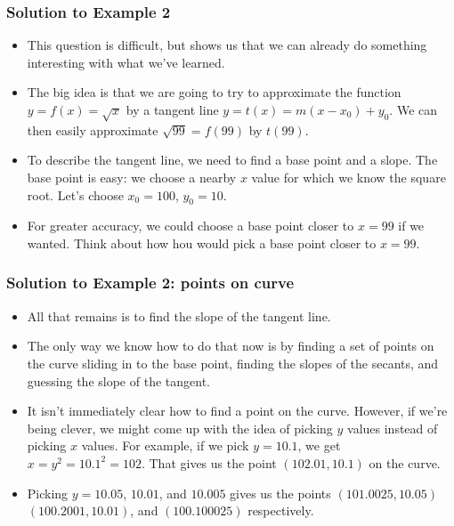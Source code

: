 \documentclass[serif,ignorenonframetext]{beamer}
\begin{document}
\begin{frame}
  \frametitle{Solution to Example 2}
  \begin{itemize}
  \item This question is difficult, 
    but shows us that we can already do something
    interesting with what we've learned.
  \item The big idea is that we are going to try to approximate the
    function $y=f(x)=\sqrt{x}$ by a tangent line
    $y=t(x)=m(x-x_0)+y_0$.  We can then easily approximate
    $\sqrt{99} = f(99)$ by $t(99)$.
  \item To describe the tangent line, we need to find a base point and
    a slope.  The base point is easy: we choose a nearby $x$ value for
    which we know the square root.  Let's choose $x_0=100$, $y_0=10$.
  \item For greater accuracy, we could choose a base point closer to
    $x=99$ if we wanted.  Think about how hou would pick a base point
    closer to $x=99$.
  \end{itemize}
\end{frame}

\begin{frame}
  \frametitle{Solution to Example 2: points on curve}
  \begin{itemize}
  \item All that remains is to find the slope of the tangent line.
  \item The only way we know how to do that now is by finding a set of
    points on the curve sliding in to the base point, finding the
    slopes of the secants, and guessing the slope of the tangent.
  \item It isn't immediately clear how to find a point on the curve.
    However, if we're being clever, we might come up with the idea of
    picking $y$ values instead of picking $x$ values.  For example, if
    we pick $y=10.1$, we get $x=y^2=10.1^2=102$.  That gives us the
    point $(102.01,10.1)$ on the curve.
  \item Picking $y=10.05$, $10.01$, and $10.005$ gives us the points
    $(101.0025,10.05)$ $(100.2001,10.01)$, and $(100.100025)$
    respectively.
  \end{itemize}
\end{frame}
\end{document}

